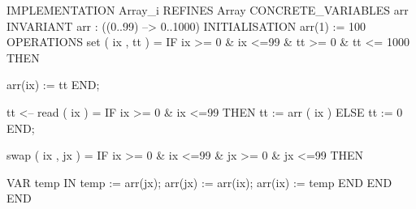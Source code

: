 \documentclass[10pt,a4paper]{article}
\begin{document}
\begin{ccode}
IMPLEMENTATION 
   Array_i
REFINES
   Array
CONCRETE_VARIABLES
   arr
INVARIANT 
    arr :  ((0..99) --> 0..1000)
INITIALISATION
   arr(1) := 100
OPERATIONS
   set ( ix , tt ) =
   IF
       ix >= 0 & ix <=99 & tt >= 0  & tt <= 1000
   THEN
       
      arr(ix) := tt 
   END;

   tt <-- read ( ix ) =
   IF
       ix >= 0 & ix <=99
   THEN
       tt := arr ( ix )
   ELSE
       tt := 0
   END;

   swap ( ix , jx ) =
   IF
        ix >= 0 & ix <=99 & jx >= 0 & jx <=99 
   THEN

       VAR temp IN
           temp := arr(jx);
           arr(jx) := arr(ix);
           arr(ix) := temp
       END
   END
END
\end{ccode}




\end{document}
